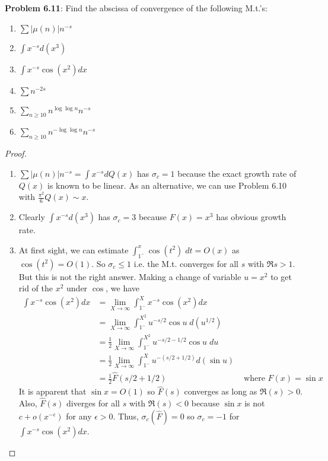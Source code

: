 \documentclass[12pt]{article}
\newcommand{\Fhat}{\widehat{F}}
\begin{document}
\fi

\textbf{Problem 6.11}: Find the abscissa of convergence of the following M.t.'s:
\begin{enumerate}
\item $\sum |\mu(n)| n^{-s}$
\item $\int x^{-s} d(x^3)$
\item $\int x^{-s} \cos(x^2) dx$
\item $\sum n^{-2s}$
\item $\sum_{n \geq 10} n^{\log \log n} n^{-s}$
\item $\sum_{n \geq 10} n^{-\log \log n} n^{-s}$
\end{enumerate}

\begin{proof}
\begin{enumerate}
\item $\sum |\mu(n)| n^{-s} = \int x^{-s} dQ(x)$ has $\sigma_c = 1$ because the exact growth rate of $Q(x)$ is known to be linear. As an alternative, we can use Problem 6.10 with $\frac{\pi^2}{6} Q(x) \sim x$.

\item Clearly $\int x^{-s} d(x^3)$ has $\sigma_c = 3$ because $F(x) = x^3$ has obvious growth rate.

\item At first sight, we can estimate $\int_{1^-}^x \cos(t^2) \; dt = O(x)$ as $\cos(t^2) = O(1)$. So $\sigma_c \leq 1$ i.e. the M.t. converges for all $s$ with $\Re s > 1$. But this is not the right answer. Making a change of variable $u = x^2$ to get rid of the $x^2$ under $\cos$, we have
\begin{align*}
\int x^{-s} \cos(x^2) dx &= \lim_{X \rightarrow \infty} \int_{1^-}^X x^{-s} \cos(x^2) dx\\
&= \lim_{X \rightarrow \infty} \int_{1^-}^{X^2} u^{-s/2} \cos u \; d(u^{1/2})\\
&= \frac{1}{2} \lim_{X \rightarrow \infty} \int_{1^-}^{X^2} u^{-s/2-1/2} \cos u \; du\\
&= \frac{1}{2} \lim_{X \rightarrow \infty} \int_{1^-}^X u^{-(s/2+1/2)} d(\sin u)\\
&= \frac{1}{2} \Fhat(s/2 + 1/2) &\text{ where } F(x) = \sin x
\end{align*}
It is apparent that $\sin x = O(1)$ so $\Fhat(s)$ converges as long as $\Re(s) > 0$. Also, $\Fhat(s)$ diverges for all $s$ with $\Re(s) < 0$ because $\sin x$ is not $c + o(x^{-\epsilon})$ for any $\epsilon > 0$. Thus, $\sigma_c(\Fhat) = 0$ so $\sigma_c = -1$ for $\int x^{-s} \cos(x^2) dx$. %


\end{enumerate}
\end{proof}
\end{document}

